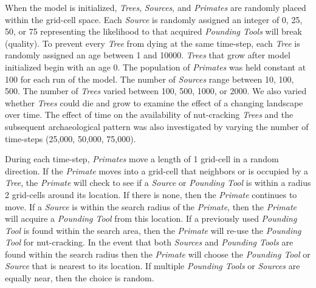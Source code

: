 \documentclass[9pt,twocolumn,twoside,]{pnas-new}
\begin{document}
When the model is initialized, \emph{Trees}, \emph{Sources}, and
\emph{Primates} are randomly placed within the grid-cell space. Each
\emph{Source} is randomly assigned an integer of 0, 25, 50, or 75
representing the likelihood to that acquired \emph{Pounding Tools} will
break (quality). To prevent every \emph{Tree} from dying at the same
time-step, each \emph{Tree} is randomly assigned an age between 1 and
10000. \emph{Trees} that grow after model initialized begin with an age
0. The population of \emph{Primates} was held constant at 100 for each
run of the model. The number of \emph{Sources} range between 10, 100,
500. The number of \emph{Trees} varied between 100, 500, 1000, or 2000.
We also varied whether \emph{Trees} could die and grow to examine the
effect of a changing landscape over time. The effect of time on the
availability of nut-cracking \emph{Trees} and the subsequent
archaeological pattern was also investigated by varying the number of
time-steps (25,000, 50,000, 75,000).

During each time-step, \emph{Primates} move a length of 1 grid-cell in a
random direction. If the \emph{Primate} moves into a grid-cell that
neighbors or is occupied by a \emph{Tree}, the \emph{Primate} will check
to see if a \emph{Source} or \emph{Pounding Tool} is within a radius 2
grid-cells around its location. If there is none, then the
\emph{Primate} continues to move. If a \emph{Source} is within the
search radius of the \emph{Primate}, then the \emph{Primate} will
acquire a \emph{Pounding Tool} from this location. If a previously used
\emph{Pounding Tool} is found within the search area, then the
\emph{Primate} will re-use the \emph{Pounding Tool} for nut-cracking. In
the event that both \emph{Sources} and \emph{Pounding Tools} are found
within the search radius then the \emph{Primate} will choose the
\emph{Pounding Tool} or \emph{Source} that is nearest to its location.
If multiple \emph{Pounding Tools} or \emph{Sources} are equally near,
then the choice is random.
\end{document}
